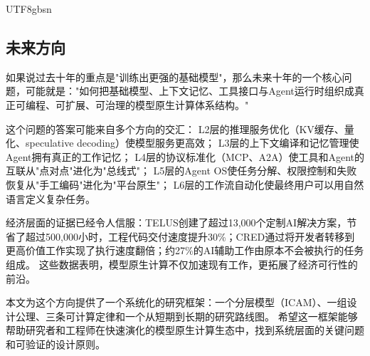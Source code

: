 \documentclass[11pt,a4paper]{article}
\begin{document}
\begin{CJK*}{UTF8}{gbsn}
\subsection{未来方向}

如果说过去十年的重点是"训练出更强的基础模型"，那么未来十年的一个核心问题，可能就是："如何把基础模型、上下文记忆、工具接口与Agent运行时组织成真正可编程、可扩展、可治理的模型原生计算体系结构。"

这个问题的答案可能来自多个方向的交汇：
L2层的推理服务优化（KV缓存、量化、speculative decoding）使模型服务更高效；
L3层的上下文编译和记忆管理使Agent拥有真正的工作记忆；
L4层的协议标准化（MCP、A2A）使工具和Agent的互联从"点对点"进化为"总线式"；
L5层的Agent OS使任务分解、权限控制和失败恢复从"手工编码"进化为"平台原生"；
L6层的工作流自动化使最终用户可以用自然语言定义复杂任务。

经济层面的证据已经令人信服：TELUS创建了超过13{,}000个定制AI解决方案，节省了超过500{,}000小时，工程代码交付速度提升30\%；CRED通过将开发者转移到更高价值工作实现了执行速度翻倍；约27\%的AI辅助工作由原本不会被执行的任务组成\cite{anthropic2026agenticreport}。
这些数据表明，模型原生计算不仅加速现有工作，更拓展了经济可行性的前沿。

本文为这个方向提供了一个系统化的研究框架：一个分层模型（ICAM）、一组设计公理、三条可计算定律和一个从短期到长期的研究路线图。
希望这一框架能够帮助研究者和工程师在快速演化的模型原生计算生态中，找到系统层面的关键问题和可验证的设计原则。



\end{CJK*}
\end{document}
